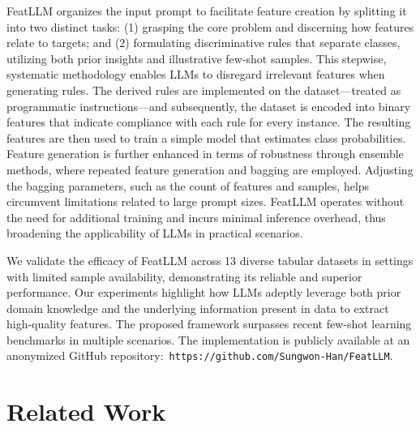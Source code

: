 \textsf{FeatLLM} organizes the input prompt to facilitate feature creation by splitting it into two distinct tasks: (1) grasping the core problem and discerning how features relate to targets; and (2) formulating discriminative rules that separate classes, utilizing both prior insights and illustrative few-shot samples. This stepwise, systematic methodology enables LLMs to disregard irrelevant features when generating rules. The derived rules are implemented on the dataset—treated as programmatic instructions—and subsequently, the dataset is encoded into binary features that indicate compliance with each rule for every instance. The resulting features are then used to train a simple model that estimates class probabilities. Feature generation is further enhanced in terms of robustness through ensemble methods, where repeated feature generation and bagging are employed. Adjusting the bagging parameters, such as the count of features and samples, helps circumvent limitations related to large prompt sizes. \textsf{FeatLLM} operates without the need for additional training and incurs minimal inference overhead, thus broadening the applicability of LLMs in practical scenarios.

We validate the efficacy of \textsf{FeatLLM} across 13 diverse tabular datasets in settings with limited sample availability, demonstrating its reliable and superior performance. Our experiments highlight how LLMs adeptly leverage both prior domain knowledge and the underlying information present in data to extract high-quality features. The proposed framework surpasses recent few-shot learning benchmarks in multiple scenarios. The implementation is publicly available at an anonymized GitHub repository:~\texttt{https://github.com/Sungwon-Han/FeatLLM}.

\section{Related Work}

